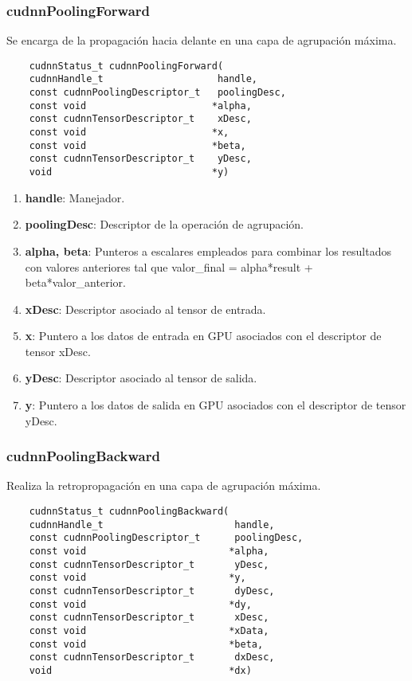 \subsubsection{cudnnPoolingForward} \label{cudnnPoolingForward}
Se encarga de la propagación hacia delante en una capa de agrupación máxima.

\begin{verbatim}
	cudnnStatus_t cudnnPoolingForward(
	cudnnHandle_t                    handle,
	const cudnnPoolingDescriptor_t   poolingDesc,
	const void                      *alpha,
	const cudnnTensorDescriptor_t    xDesc,
	const void                      *x,
	const void                      *beta,
	const cudnnTensorDescriptor_t    yDesc,
	void                            *y)
\end{verbatim}

\begin{enumerate}
	\item \textbf{handle}: Manejador.
	\item \textbf{poolingDesc}: Descriptor de la operación de agrupación.
	\item \textbf{alpha, beta}: Punteros a escalares empleados para combinar los resultados con valores anteriores tal que valor\_final = alpha*result + beta*valor\_anterior.
	\item \textbf{xDesc}: Descriptor asociado al tensor de entrada.
	\item \textbf{x}: Puntero a los datos de entrada en GPU asociados con el descriptor de tensor xDesc.
	\item \textbf{yDesc}: Descriptor asociado al tensor de salida.
	\item \textbf{y}: Puntero a los datos de salida en GPU asociados con el descriptor de tensor yDesc.
\end{enumerate}
\cite{cuDNN_pool_fwd}

\subsubsection{cudnnPoolingBackward} \label{cudnnPoolingBackward}
Realiza la retropropagación en una capa de agrupación máxima.

\begin{verbatim}
	cudnnStatus_t cudnnPoolingBackward(
	cudnnHandle_t                       handle,
	const cudnnPoolingDescriptor_t      poolingDesc,
	const void                         *alpha,
	const cudnnTensorDescriptor_t       yDesc,
	const void                         *y,
	const cudnnTensorDescriptor_t       dyDesc,
	const void                         *dy,
	const cudnnTensorDescriptor_t       xDesc,
	const void                         *xData,
	const void                         *beta,
	const cudnnTensorDescriptor_t       dxDesc,
	void                               *dx)
\end{verbatim}

